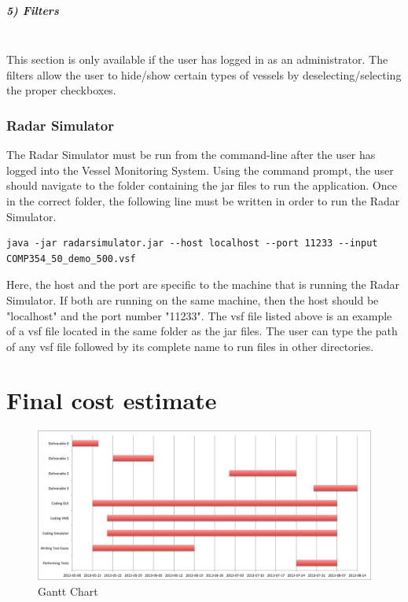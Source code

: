\documentclass{article}
\begin{document}
\subparagraph{5) Filters \\ \\}
This section is only available if the user has logged in as an administrator. The filters allow the user to hide/show certain types of vessels by deselecting/selecting the proper checkboxes.\\

\subsubsection{Radar Simulator}
The Radar Simulator must be run from the command-line after the user has logged into the Vessel Monitoring System. Using the command prompt, the user should navigate to the folder containing the jar files to run the application. Once in the correct folder, the following line must be written in order to run the Radar Simulator.

\begin{verbatim}
java -jar radarsimulator.jar --host localhost --port 11233 --input COMP354_50_demo_500.vsf
\end{verbatim}

Here, the host and the port are specific to the machine that is running the Radar Simulator. If both are running on the same machine, then the host should be "localhost" and the port number "11233". The vsf file listed above is an example of a vsf file located in the same folder as the jar files. The user can type the path of any vsf file followed by its complete name to run files in other directories.

\break

{\color{royalbluedark}\section{Final cost estimate}} %


\begin{figure}[!htb]
\caption{Gantt Chart}
\centering
\includegraphics[scale=0.55]{charts/GanttChart.png}
\end{figure}
\end{document}
